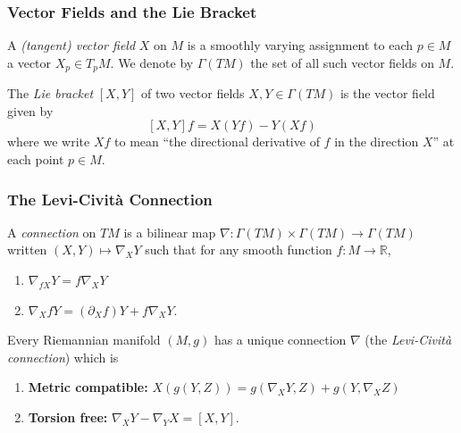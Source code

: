 \documentclass{beamer}
\newcommand{\R}{\mathbb{R}}
\theoremstyle{definition}
\begin{document}
\begin{frame}
    \frametitle{Vector Fields and the Lie Bracket}

    \begin{definition}
        A \emph{(tangent) vector field} $X$ on $M$ is a smoothly varying assignment
        to each $p \in M$ a vector $X_p \in T_pM$. We denote by $\Gamma(TM)$ the
        set of all such vector fields on $M$.
    \end{definition}

    \begin{definition}
        The \emph{Lie bracket} $[X,Y]$ of two vector fields $X, Y \in \Gamma(TM)$
        is the vector field given by
        \[
          [X,Y]f = X(Yf) - Y(Xf)  
        \]
        where we write $Xf$ to mean ``the directional derivative of $f$ in the direction $X$''
        at each point $p \in M$.
    \end{definition}

\end{frame}

\begin{frame}
    \frametitle{The Levi-Civit\`{a} Connection}

    \begin{definition}
        A \emph{connection} on $TM$ is a bilinear map
        \(
            \nabla : \Gamma(TM) \times \Gamma(TM) \to \Gamma(TM)
        \)
        written $(X,Y) \mapsto \nabla_X Y$ such that for any smooth function
        $f : M \to \R$,
        \begin{enumerate}
            \item $\nabla_{fX} Y = f\nabla_XY$
            \item $\nabla_X fY = (\partial_Xf)Y + f\nabla_XY$.
        \end{enumerate}
    \end{definition}
    \begin{theorem}
        Every Riemannian manifold $(M,g)$ has a unique connection $\nabla$
        (the \emph{Levi-Civit\`{a} connection}) which is
        \begin{enumerate}
            \item \textbf{Metric compatible:} $X(g(Y,Z)) = g(\nabla_XY,Z) + g(Y,\nabla_XZ)$
            \item \textbf{Torsion free:} $\nabla_XY - \nabla_YX = [X,Y]$.
        \end{enumerate}
    \end{theorem}
\end{frame}
\end{document}
